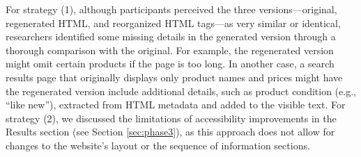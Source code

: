 For strategy (1), although participants perceived the three versions—original, regenerated HTML, and reorganized HTML tags—as very similar or identical, researchers identified some missing details in the generated version through a thorough comparison with the original. For example, the regenerated version might omit certain products if the page is too long. In another case, a search results page that originally displays only product names and prices might have the regenerated version include additional details, such as product condition (e.g., ``like new''), extracted from HTML metadata and added to the visible text. For strategy (2), we discussed the limitations of accessibility improvements in the Results section (see Section \ref{sec:phase3}), as this approach does not allow for changes to the website's layout or the sequence of information sections.

